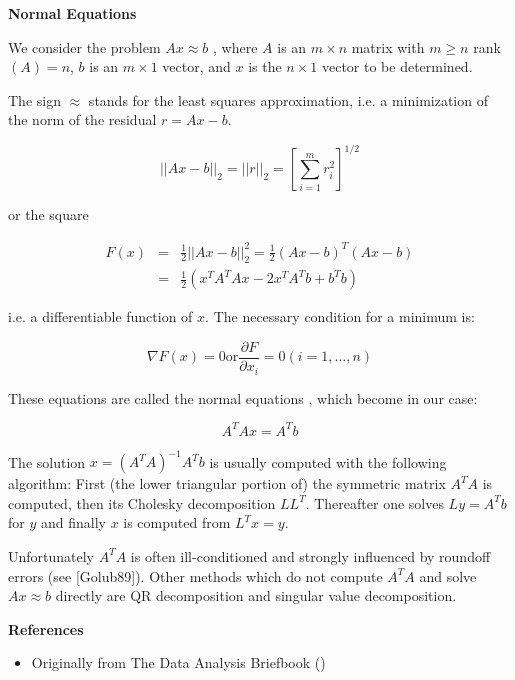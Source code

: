 \documentclass[12pt]{article}
\begin{document}
{\bf Normal Equations}

We consider the problem $Ax \approx b$  , where $A$ is an $m \times n$ matrix with $m \ge n$ rank $(A)=n$, $b$ is an $m \times 1$ vector, and $x$ is the $n \times 1$ vector to be determined.

The sign $\approx$ stands for the least squares approximation, i.e. a minimization of the norm of the residual $r = Ax - b$.

$$ ||Ax-b||_2 = ||r||_2 = \left[ \sum_{i=1}^m r_i^2 \right]^{1/2}$$

or the square

\begin{eqnarray*}
 F(x) & = & \frac{1}{2} ||Ax-b||_2^2 = \frac{1}{2}(Ax-b)^T (Ax-b) \\
 & = & \frac{1}{2}(x^TA^TAx -2x^TA^Tb + b^Tb)
\end{eqnarray*}

i.e. a differentiable function of $x$. The necessary condition for a minimum is:

$$ \nabla F(x) =0 \text{or} \frac{\partial F}{\partial x_i} = 0 (i=1,\ldots,n) $$

These equations are called the normal equations , which become in our case:

$$ A^TAx = A^T b $$

The solution $x=(A^TA)^{-1}A^Tb$ is usually computed with the following algorithm: First (the lower triangular portion of) the symmetric matrix $A^TA$ is computed, then its Cholesky decomposition $LL^T$. Thereafter one solves $Ly=A^Tb$ for $y$ and finally $x$ is computed from $L^Tx=y$.

Unfortunately $A^TA$ is often ill-conditioned and strongly influenced by roundoff errors (see [Golub89]). Other methods which do not compute $A^TA$ and solve $Ax \approx b$ directly are QR decomposition and singular value decomposition.

{\bf References}

\begin{itemize}
\item Originally from The Data Analysis Briefbook ()
\end{itemize}
\end{document}
